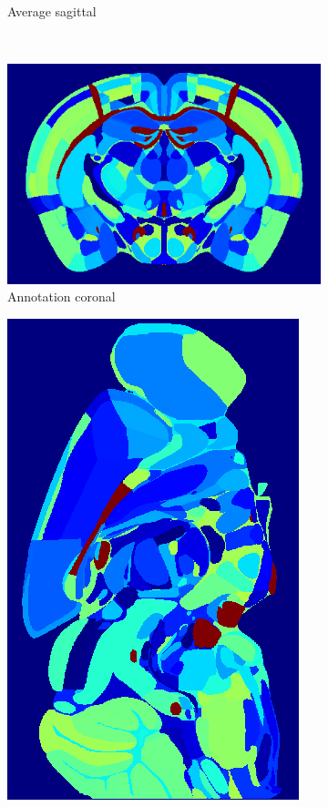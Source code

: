 \documentclass[]{article}
\begin{document}
\begin{figure}
\begin{subfigure}{.3\textwidth}
		\caption{Average sagittal}
		\label{fig:average_sag}
	\end{subfigure}\\
	\begin{subfigure}{.43\textwidth}
		\centering
		\includegraphics[width=.9\linewidth]{figures/ano_coronal.png}
		\caption{Annotation coronal}
		\label{fig:ano_cor}
	\end{subfigure}	
	\begin{subfigure}{.3\textwidth}
		\centering
		\includegraphics[width=.9\linewidth, angle=270]{figures/ano_sagittal.png}

\end{subfigure}
\end{figure}
\end{document}
